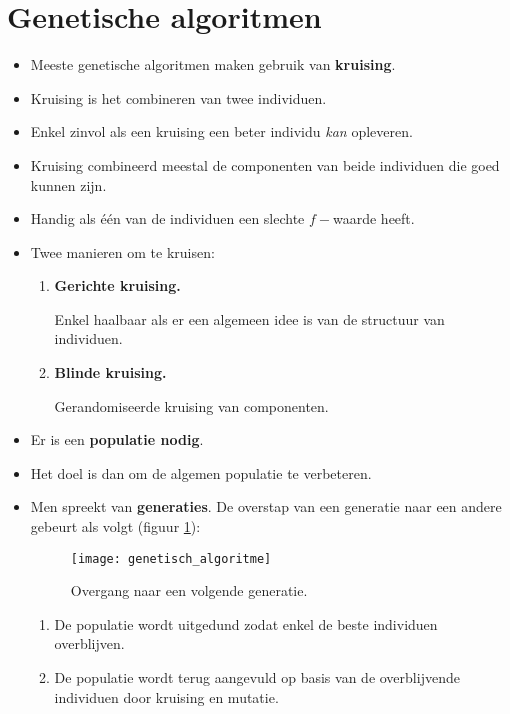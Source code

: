 \section{Genetische algoritmen}
\begin{itemize}
    \item Meeste genetische algoritmen maken gebruik van \textbf{kruising}.
    \item Kruising is het combineren van twee individuen.
    \item Enkel zinvol als een kruising een beter individu \textit{kan} opleveren.
    \item Kruising combineerd meestal de componenten van beide individuen die goed kunnen zijn.
    \item Handig als één van de individuen een slechte $f-$waarde heeft.
    \item Twee manieren om te kruisen:
    \begin{enumerate}
        \item \textbf{Gerichte kruising.}
        
        Enkel haalbaar als er een algemeen idee is van de structuur van individuen.
        \item \textbf{Blinde kruising.}

        Gerandomiseerde kruising van componenten.

    \end{enumerate}
    \item Er is een \textbf{populatie nodig}.
    \item Het doel is dan om de algemen populatie te verbeteren.
    \item Men spreekt van \textbf{generaties}. De overstap van een generatie naar een andere gebeurt als volgt (figuur \ref{fig:genetisch_algoritme}):
    \begin{figure}[ht]
        \centering
        \texttt{[image: genetisch\_algoritme]}
        \caption{Overgang naar een volgende generatie.}
        \label{fig:genetisch_algoritme}
    \end{figure}
    \begin{enumerate}
        \item De populatie wordt uitgedund zodat enkel de beste individuen overblijven.
        \item De populatie wordt terug aangevuld op basis van de overblijvende individuen door kruising en mutatie.
    \end{enumerate}


\end{itemize}
